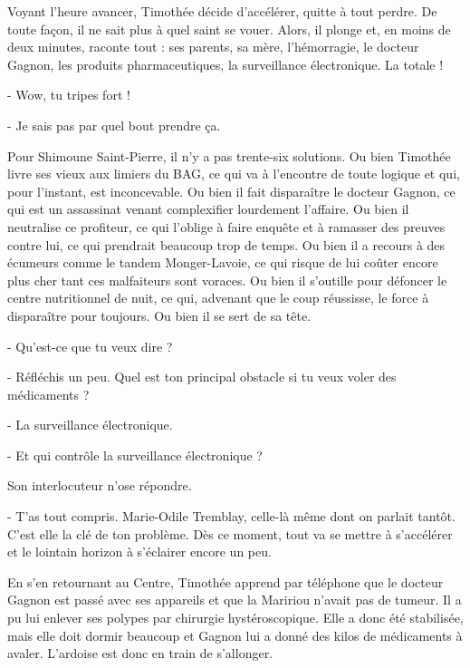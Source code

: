 Voyant l’heure avancer, Timothée décide d’accélérer, quitte à tout perdre. De toute façon, il ne sait plus à quel saint se vouer. Alors, il plonge et, en moins de deux minutes, raconte tout : ses parents, sa mère, l’hémorragie, le docteur Gagnon, les produits pharmaceutiques, la surveillance électronique. La totale !

- Wow, tu tripes fort !

- Je sais pas par quel bout prendre ça.

Pour Shimoune Saint-Pierre, il n’y a pas trente-six solutions. Ou bien Timothée livre ses vieux aux limiers du BAG, ce qui va à l’encontre de toute logique et qui, pour l’instant, est inconcevable. Ou bien il fait disparaître le docteur Gagnon, ce qui est un assassinat venant complexifier lourdement l’affaire. Ou bien il neutralise ce profiteur, ce qui l’oblige à faire enquête et à ramasser des preuves contre lui, ce qui prendrait beaucoup trop de temps. Ou bien il a recours à des écumeurs comme le tandem Monger-Lavoie, ce qui risque de lui coûter encore plus cher tant ces malfaiteurs sont voraces. Ou bien il s’outille pour défoncer le centre nutritionnel de nuit, ce qui, advenant que le coup réussisse, le force à disparaître pour toujours. Ou bien il se sert de sa tête.

- Qu’est-ce que tu veux dire ?

- Réfléchis un peu. Quel est ton principal obstacle si tu veux voler des médicaments ?

- La surveillance électronique.

- Et qui contrôle la surveillance électronique ?

Son interlocuteur n’ose répondre.

- T’as tout compris. Marie-Odile Tremblay, celle-là même dont on parlait tantôt. C’est elle la clé de ton problème.
Dès ce moment, tout va se mettre à s’accélérer et le lointain horizon à s’éclairer encore un peu.

En s’en retournant au Centre, Timothée apprend par téléphone que le docteur Gagnon est passé avec ses appareils et que la Maririou n’avait pas de tumeur. Il a pu lui enlever ses polypes par chirurgie hystéroscopique. Elle a donc été stabilisée, mais elle doit dormir beaucoup et Gagnon lui a donné des kilos de médicaments à avaler. L’ardoise est donc en train de s’allonger.

